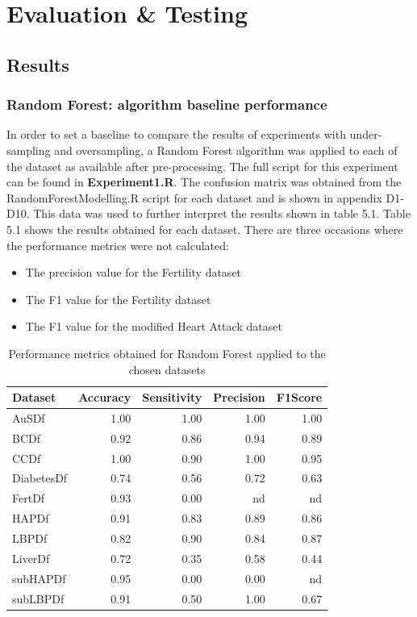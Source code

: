 \chapter{Evaluation \& Testing}\label{ch:Evaluation}
\section{Results}
\subsection{Random Forest: algorithm baseline performance}
In order to set a baseline to compare the results of experiments with under-sampling and oversampling, a Random Forest algorithm was applied to each of the dataset as available after pre-processing. The full script for this experiment can be found in \textbf{Experiment1.R}.\newline
The confusion matrix was obtained from the RandomForestModelling.R script for each dataset and is shown in appendix D1-D10. This data was used to further interpret the results shown in table 5.1.\newline
Table 5.1 shows the results obtained for each dataset. There are three occasions where the performance metrics were not calculated:
\begin{itemize}
    \item The precision value for the Fertility dataset
    \item The F1 value for the Fertility dataset
    \item The F1 value for the modified Heart Attack dataset
\end{itemize}

\begin{table}[!htbp]
\centering
\begin{tabular}{lrrrr}
  \hline
  \rowcolor{LightCyan}
Dataset & Accuracy & Sensitivity & Precision & F1Score \\ 
  \hline
AuSDf & 1.00 & 1.00 & 1.00 & 1.00 \\ 
  BCDf & 0.92 & 0.86 & 0.94 & 0.89 \\ 
  CCDf & 1.00 & 0.90 & 1.00 & 0.95 \\ 
  DiabetesDf & 0.74 & 0.56 & 0.72 & 0.63 \\ 
  FertDf & 0.93 & 0.00 & nd & nd \\ 
  HAPDf & 0.91 & 0.83 & 0.89 & 0.86 \\ 
  LBPDf & 0.82 & 0.90 & 0.84 & 0.87 \\ 
  LiverDf & 0.72 & 0.35 & 0.58 & 0.44 \\ 
  subHAPDf & 0.95 & 0.00 & 0.00 & nd \\ 
  subLBPDf & 0.91 & 0.50 & 1.00 & 0.67 \\ 
   \hline
\end{tabular}
\caption{Performance metrics obtained for Random Forest applied to the chosen datasets}
\label{tab:RfMetrics}
\end{table}

